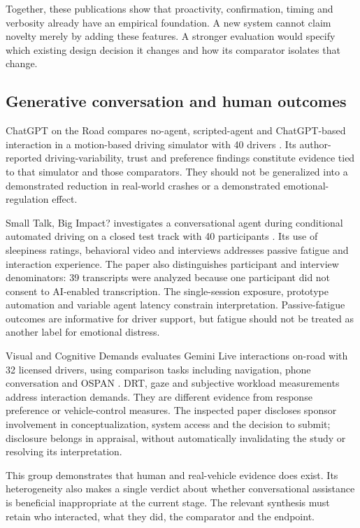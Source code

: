 \documentclass[11pt,a4paper]{article}
\begin{document}
Together, these publications show that proactivity, confirmation, timing
and verbosity already have an empirical foundation. A new system cannot
claim novelty merely by adding these features. A stronger evaluation
would specify which existing design decision it changes and how its
comparator isolates that change.

\subsection{Generative conversation and human
outcomes}\label{generative-conversation-and-human-outcomes}

ChatGPT on the Road compares no-agent, scripted-agent and ChatGPT-based
interaction in a motion-based driving simulator with 40 drivers
\citep{S4}. Its author-reported driving-variability, trust and
preference findings constitute evidence tied to that simulator and those
comparators. They should not be generalized into a demonstrated
reduction in real-world crashes or a demonstrated emotional-regulation
effect.

Small Talk, Big Impact? investigates a conversational agent during
conditional automated driving on a closed test track with 40
participants \citep{S5}. Its use of sleepiness ratings, behavioral video
and interviews addresses passive fatigue and interaction experience. The
paper also distinguishes participant and interview denominators: 39
transcripts were analyzed because one participant did not consent to
AI-enabled transcription. The single-session exposure, prototype
automation and variable agent latency constrain interpretation.
Passive-fatigue outcomes are informative for driver support, but fatigue
should not be treated as another label for emotional distress.

Visual and Cognitive Demands evaluates Gemini Live interactions on-road
with 32 licensed drivers, using comparison tasks including navigation,
phone conversation and OSPAN \citep{S6}. DRT, gaze and subjective
workload measurements address interaction demands. They are different
evidence from response preference or vehicle-control measures. The
inspected paper discloses sponsor involvement in conceptualization,
system access and the decision to submit; disclosure belongs in
appraisal, without automatically invalidating the study or resolving its
interpretation.

This group demonstrates that human and real-vehicle evidence does exist.
Its heterogeneity also makes a single verdict about whether
conversational assistance is beneficial inappropriate at the current
stage. The relevant synthesis must retain who interacted, what they did,
the comparator and the endpoint.
\end{document}
